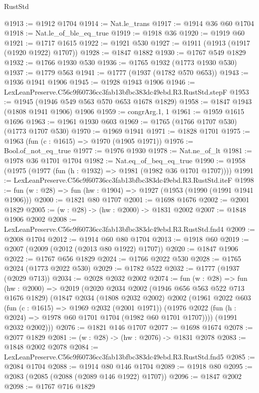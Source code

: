 \begin{lexlean}{RustStd}
\begin{coremodule}
@1913 := @1912 @1704
@1914 := Nat.le_trans
@1917 := @1914 @36 @60 @1704
@1918 := Nat.le_of_ble_eq_true
@1919 := @1918 @36
@1920 := @1919 @60
@1921 := @1717 @1615
@1922 := @1921 @530
@1927 := @1911 (@1913 (@1917 (@1920 @1922) @1707))
@1928 := @1847 @1882
@1930 := @1767 @549 @1829
@1932 := @1766 @1930 @530
@1936 := @1765 @1932 (@1773 @1930 @530)
@1937 := @1779 @563
@1941 := @1777 (@1937 (@1782 @570 @653))
@1943 := @1936 @1941 @1906
@1945 := @1928 @1943 @1906
@1946 := LexLeanPreserve.C56c9f60736cc3fab13bfbc383dc49ebd.R3.RustStd.stepF
@1953 := @1945 (@1946 @549 @563 @570 @653 @1678 @1829)
@1958 := @1847 @1943 (@1808 @1941 @1906) @1906
@1959 := congrArg.{1, 1}
@1961 := @1959 @1615 @1696
@1963 := @1961 @1930 @603
@1969 := @1765 (@1766 @1707 @530) (@1773 @1707 @530)
@1970 := @1969 @1941
@1971 := @1828 @1701
@1975 := @1963 (fun (c : @1615) => @1970 (@1905 @1971))
@1976 := Bool.of_not_eq_true
@1977 := @1976 @1930
@1978 := Nat.ne_of_lt
@1981 := @1978 @36 @1701 @1704
@1982 := Nat.eq_of_beq_eq_true
@1990 := @1958 (@1975 (@1977 (fun (h : @1932) => @1981 (@1982 @36 @1701 @1707))))
@1991 := LexLeanPreserve.C56c9f60736cc3fab13bfbc383dc49ebd.R3.RustStd.iteF
@1998 := fun (w : @28) => fun (hw : @1904) => @1927 (@1953 (@1990 (@1991 @1941 @1906)))
@2000 := @1821 @80 @1707
@2001 := @1698 @1676
@2002 := @2001 @1829
@2005 := (w : @28) -> (hw : @2000) -> @1831 @2002
@2007 := @1848 @1906 @2002
@2008 := LexLeanPreserve.C56c9f60736cc3fab13bfbc383dc49ebd.R3.RustStd.fnd4
@2009 := @2008 @1704
@2012 := @1914 @60 @80 @1704
@2013 := @1918 @60
@2019 := @2007 (@2009 (@2012 (@2013 @80 @1922) @1707))
@2020 := @1847 @1906
@2022 := @1767 @656 @1829
@2024 := @1766 @2022 @530
@2028 := @1765 @2024 (@1773 @2022 @530)
@2029 := @1782 @522
@2032 := @1777 (@1937 (@2029 @713))
@2034 := @2028 @2032 @2002
@2074 := fun (w : @28) =>
  fun (hw : @2000) =>
  @2019
    (@2020
      @2034
      @2002
      (@1946 @656 @563 @522 @713 @1676 @1829)
      (@1847
        @2034
        (@1808 @2032 @2002)
        @2002
        (@1961
          @2022
          @603
          (fun (c : @1615) => @1969 @2032 (@2001 @1971))
          (@1976 @2022 (fun (h : @2024) => @1978 @60 @1701 @1704 (@1982 @60 @1701 @1707))))
        (@1991 @2032 @2002)))
@2076 := @1821 @146 @1707
@2077 := @1698 @1674
@2078 := @2077 @1829
@2081 := (w : @28) -> (hw : @2076) -> @1831 @2078
@2083 := @1848 @2002 @2078
@2084 := LexLeanPreserve.C56c9f60736cc3fab13bfbc383dc49ebd.R3.RustStd.fnd5
@2085 := @2084 @1704
@2088 := @1914 @80 @146 @1704
@2089 := @1918 @80
@2095 := @2083 (@2085 (@2088 (@2089 @146 @1922) @1707))
@2096 := @1847 @2002
@2098 := @1767 @716 @1829

\end{coremodule}
\end{lexlean}
